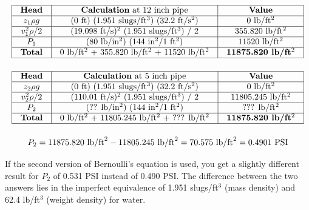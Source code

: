 
$$\vbox{\offinterlineskip
\halign{\strut
\vrule \quad\hfil # \ \hfil & 
\vrule \quad\hfil # \ \hfil & 
\vrule \quad\hfil # \ \hfil \vrule \cr
\noalign{\hrule}
%
{\bf Head} & {\bf Calculation} at 12 inch pipe & {\bf Value} \cr
%
\noalign{\hrule}
%
$z_1 \rho g$ & (0 ft) (1.951 slugs/ft$^{3}$) (32.2 ft/s$^{2}$) & 0 lb/ft$^{2}$ \cr
%
\noalign{\hrule}
%
$v_1^2 \rho / 2$ & (19.098 ft/s)$^{2}$ (1.951 slugs/ft$^{3}$) / 2 & 355.820 lb/ft$^{2}$ \cr
%
\noalign{\hrule}
%
$P_1$ & (80 lb/in$^{2}$) (144 in$^{2}$/1 ft$^{2}$) & 11520 lb/ft$^{2}$ \cr
%
\noalign{\hrule}
%
{\bf Total} &  0 lb/ft$^{2}$ + 355.820 lb/ft$^{2}$ + 11520 lb/ft$^{2}$ & {\bf 11875.820 lb/ft$^{2}$} \cr
%
\noalign{\hrule}
} %
}$$ %

\vskip 10pt


$$\vbox{\offinterlineskip
\halign{\strut
\vrule \quad\hfil # \ \hfil & 
\vrule \quad\hfil # \ \hfil & 
\vrule \quad\hfil # \ \hfil \vrule \cr
\noalign{\hrule}
%
{\bf Head} & {\bf Calculation} at 5 inch pipe & {\bf Value} \cr
%
\noalign{\hrule}
%
$z_2 \rho g$ & (0 ft) (1.951 slugs/ft$^{3}$) (32.2 ft/s$^{2}$) & 0 lb/ft$^{2}$ \cr
%
\noalign{\hrule}
%
$v_2^2 \rho / 2$ & (110.01 ft/s)$^{2}$ (1.951 slugs/ft$^{3}$) / 2 & 11805.245 lb/ft$^{2}$ \cr
%
\noalign{\hrule}
%
$P_2$ & (?? lb/in$^{2}$) (144 in$^{2}$/1 ft$^{2}$) & ??? lb/ft$^{2}$ \cr
%
\noalign{\hrule}
%
{\bf Total} &  0 lb/ft$^{2}$ + 11805.245 lb/ft$^{2}$ + ??? lb/ft$^{2}$ & {\bf 11875.820 lb/ft$^{2}$} \cr
%
\noalign{\hrule}
} %
}$$ %

$$P_2 = 11875.820 \hbox{ lb/ft}^2 - 11805.245 \hbox{ lb/ft}^2 = 70.575 \hbox{ lb/ft}^2 = 0.4901 \hbox{ PSI}$$

\vskip 10pt

If the second version of Bernoulli's equation is used, you get a slightly different result for $P_2$ of 0.531 PSI instead of 0.490 PSI.  The difference between the two answers lies in the imperfect equivalence of 1.951 slugs/ft$^{3}$ (mass density) and 62.4 lb/ft$^{3}$ (weight density) for water.

\vskip 10pt

